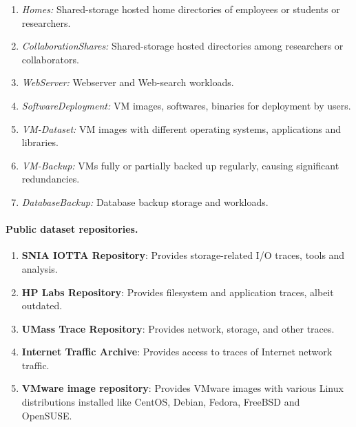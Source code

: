\begin{enumerate}
	\singlespacing
 \item \textit{Homes:} Shared-storage hosted home directories of
 employees or students or researchers.
 \item \textit{CollaborationShares:} Shared-storage hosted directories
 among researchers or collaborators.
 \item \textit{WebServer:} Webserver and Web-search workloads.
 \item \textit{SoftwareDeployment:} VM images, softwares, binaries 
	 for deployment by users.
 \item \textit{VM-Dataset:} VM images with
 different operating systems, applications and libraries.
 \item \textit{VM-Backup:} VMs fully or partially backed up regularly, 
	 causing significant redundancies.
 \item \textit{DatabaseBackup:} Database backup storage and workloads.
 \end{enumerate}


\paragraph{Public dataset repositories.} 
\begin{enumerate}
		\singlespacing
    \item \textbf{SNIA IOTTA Repository}: Provides storage-related I/O traces, tools and analysis.
    \item \textbf{HP Labs Repository}: Provides filesystem and application traces, albeit outdated.
    \item \textbf{UMass Trace Repository}: Provides network, storage, and other traces.
    \item \textbf{Internet Traffic Archive}: Provides access to traces of Internet network traffic.
    \item \textbf{VMware image repository}: Provides VMware images with various Linux distributions installed like CentOS, Debian, Fedora, FreeBSD and OpenSUSE.
\end{enumerate}

